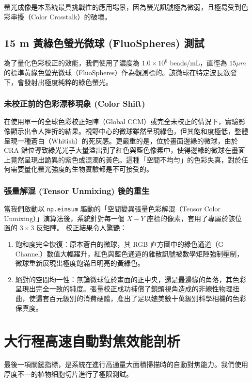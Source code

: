 螢光成像是本系統最具挑戰性的應用場景，因為螢光訊號極為微弱，且極易受到色彩串擾（Color Crosstalk）的破壞。

\subsection{15 \textmu m 黃綠色螢光微球 (FluoSpheres) 測試}
為了量化色彩校正的效能，我們使用了濃度為 $1.0 \times 10^6$ beads/mL，直徑為 $15 \mu m$ 的標準黃綠色螢光微球（FluoSpheres）作為觀測標的。該微球在特定波長激發下，會發射出極度純粹的綠色螢光。

\subsubsection{未校正前的色彩漂移現象 (Color Shift)}
在使用單一的全球色彩校正矩陣（Global CCM）或完全未校正的情況下，實驗影像顯示出令人挫折的結果。視野中心的微球雖然呈現綠色，但其飽和度極低，整體呈現一種蒼白（Whitish）的死灰感。更嚴重的是，位於畫面邊緣的微球，由於 CRA 錯位導致綠光光子大量溢出到了紅色與藍色像素中，使得邊緣的微球在畫面上竟然呈現出詭異的紫色或混濁的黃色。這種「空間不均勻」的色彩失真，對於任何需要量化螢光強度的生物實驗都是不可接受的。

\subsubsection{張量解混 (Tensor Unmixing) 後的重生}
當我們啟動以 \texttt{np.einsum} 驅動的「空間變異張量色彩解混（Tensor Color Unmixing）」演算法後，系統針對每一個 $X-Y$ 座標的像素，套用了專屬於該位置的 $3 \times 3$ 反矩陣。
校正結果令人驚艷：
\begin{enumerate}
    \item 飽和度完全恢復：原本蒼白的微球，其 RGB 直方圖中的綠色通道（G Channel）數值大幅躍升，紅色與藍色通道的雜散訊號被數學矩陣強制壓制，微球重新展現出極度飽滿且明亮的黃綠色。
    \item 絕對的空間均一性：無論微球位於畫面的正中央，還是最邊緣的角落，其色彩呈現出完全一致的純度。張量校正成功補償了鏡頭視角造成的非線性物理扭曲，使這套百元級別的消費硬體，產出了足以媲美數十萬級別科學相機的色彩保真度。
\end{enumerate}

\section{大行程高速自動對焦效能剖析}

最後一項關鍵指標，是系統在進行高通量大面積掃描時的自動對焦能力。我們使用厚度不一的植物細胞切片進行了極限測試。

